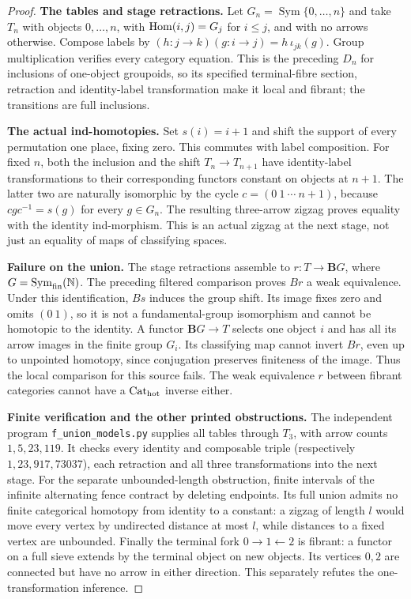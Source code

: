 \begin{proof}
\textbf{The tables and stage retractions.} Let
$G_n=\operatorname{Sym}\{0,\ldots,n\}$ and take $T_n$ with objects
$0,\ldots,n$, with $\operatorname{Hom}(i,j)=G_j$ for $i\leq j$, and with no arrows
otherwise. Compose labels by
$(h:j\to k)(g:i\to j)=h\,\iota_{jk}(g)$.
Group multiplication verifies every category equation. This is the
preceding $D_n$ for inclusions of one-object groupoids, so its specified
terminal-fibre section, retraction and identity-label transformation
make it local and fibrant; the transitions are full inclusions.

\textbf{The actual ind-homotopies.} Set $s(i)=i+1$ and shift the support
of every permutation one place, fixing zero. This commutes with label
composition. For fixed $n$, both the inclusion and the shift
$T_n\to T_{n+1}$ have identity-label transformations to their
corresponding functors constant on objects at $n+1$. The latter two
are naturally isomorphic by the cycle $c=(0\ 1\ \cdots\ n+1)$,
because $cgc^{-1}=s(g)$ for every $g\in G_n$.
The resulting three-arrow zigzag proves equality with the identity
ind-morphism. This is an actual zigzag at the next stage, not just an
equality of maps of classifying spaces.

\textbf{Failure on the union.} The stage retractions assemble to
$r:T\to\mathbf BG$, where
$G=\operatorname{Sym}_{\mathrm{fin}}(\mathbb N)$. The preceding filtered
comparison proves $Br$ a weak equivalence. Under this identification,
$Bs$ induces the group shift. Its image fixes zero and omits $(0\ 1)$,
so it is not a fundamental-group isomorphism and cannot be homotopic
to the identity. A functor $\mathbf BG\to T$ selects one object $i$
and has all its arrow images in the finite group $G_i$. Its classifying
map cannot invert $Br$, even up to unpointed homotopy, since conjugation
preserves finiteness of the image. Thus the local comparison for this
source fails. The weak equivalence $r$ between fibrant categories cannot
have a $\mathrm {Cat}_{\mathrm{hot}}$ inverse either.

\textbf{Finite verification and the other printed obstructions.}
The independent program \texttt{f\_union\_models.py} supplies all
tables through $T_3$, with arrow counts $1,5,23,119$. It checks every
identity and composable triple (respectively $1,23,917,73037$), each
retraction and all three transformations into the next stage.
For the separate unbounded-length obstruction, finite intervals of the
infinite alternating fence contract by deleting endpoints. Its full
union admits no finite categorical homotopy from identity to a constant:
a zigzag of length $l$ would move every vertex by undirected distance
at most $l$, while distances to a fixed vertex are unbounded. Finally
the terminal fork $0\to1\leftarrow2$ is fibrant: a functor on a full
sieve extends by the terminal object on new objects. Its vertices $0,2$
are connected but have no arrow in either direction. This separately
refutes the one-transformation inference.
\end{proof}

